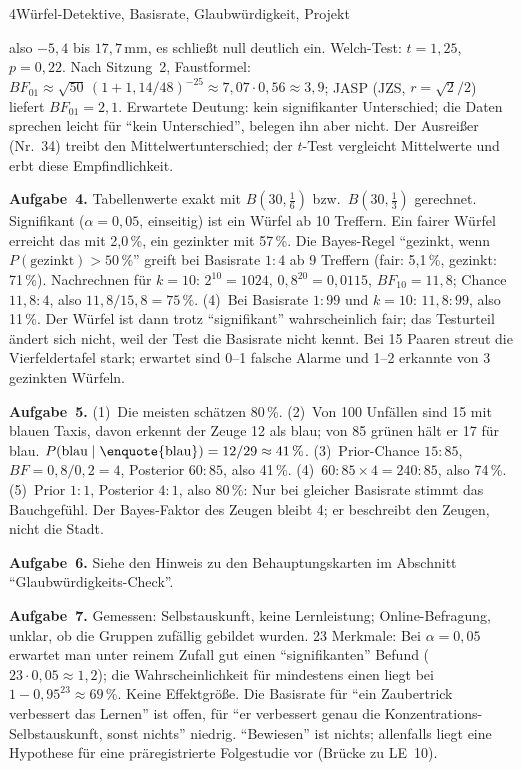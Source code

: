 \begin{uebungsblattb}{4}{Würfel-Detektive, Basisrate, Glaubwürdigkeit, Projekt}
\begin{lehrhinweis}[Erwartungshorizont]
also $-5{,}4$ bis $17{,}7$\,mm, es schließt null deutlich ein. Welch-Test: $t=1{,}25$, $p=0{,}22$. Nach Sitzung~2, Faustformel:
$\mathit{BF}_{01}\approx\sqrt{50}\,(1+1{,}14/48)^{-25}\approx 7{,}07\cdot0{,}56\approx3{,}9$;
JASP (JZS, $r=\sqrt2/2$) liefert $\mathit{BF}_{01}=2{,}1$. Erwartete
Deutung: kein signifikanter Unterschied; die Daten sprechen leicht für
\enquote{kein Unterschied}, belegen ihn aber nicht. Der Ausreißer
(Nr.~34) treibt den Mittelwertunterschied; der $t$-Test vergleicht
Mittelwerte und erbt diese Empfindlichkeit.

\textbf{Aufgabe~4.} Tabellenwerte exakt mit $B(30,\tfrac16)$ bzw.\
$B(30,\tfrac13)$ gerechnet. Signifikant ($\alpha=0{,}05$, einseitig) ist
ein Würfel ab 10 Treffern. Ein fairer Würfel erreicht das mit 2,0\,\%, ein
gezinkter mit 57\,\%. Die Bayes-Regel \enquote{gezinkt, wenn
$P(\text{gezinkt})>50\,\%$} greift bei Basisrate $1:4$ ab 9 Treffern
(fair: 5,1\,\%, gezinkt: 71\,\%). Nachrechnen für $k=10$:
$2^{10}=1024$, $0{,}8^{20}=0{,}0115$, $\mathit{BF}_{10}=11{,}8$; Chance
$11{,}8:4$, also $11{,}8/15{,}8=75\,\%$. (4)~Bei Basisrate $1:99$ und
$k=10$: $11{,}8:99$, also 11\,\%. Der Würfel ist dann trotz
\enquote{signifikant} wahrscheinlich fair; das Testurteil ändert sich
nicht, weil der Test die Basisrate nicht kennt. Bei 15 Paaren streut die
Vierfeldertafel stark; erwartet sind 0--1 falsche Alarme und 1--2 erkannte
von 3 gezinkten Würfeln.

\textbf{Aufgabe~5.} (1)~Die meisten schätzen 80\,\%. (2)~Von 100 Unfällen
sind 15 mit blauen Taxis, davon erkennt der Zeuge 12 als blau; von 85
grünen hält er 17 für blau. $P(\text{blau}\mid\text{\enquote{blau}})=12/29\approx41\,\%$.
(3)~Prior-Chance $15:85$, $\mathit{BF}=0{,}8/0{,}2=4$, Posterior
$60:85$, also 41\,\%. (4)~$60:85\times4=240:85$, also 74\,\%.
(5)~Prior $1:1$, Posterior $4:1$, also 80\,\%: Nur bei gleicher Basisrate
stimmt das Bauchgefühl. Der Bayes-Faktor des Zeugen bleibt 4; er
beschreibt den Zeugen, nicht die Stadt.

\textbf{Aufgabe~6.} Siehe den Hinweis zu den Behauptungskarten im
Abschnitt \enquote{Glaubwürdigkeits-Check}.

\textbf{Aufgabe~7.} Gemessen: Selbstauskunft, keine Lernleistung;
Online-Befragung, unklar, ob die Gruppen zufällig gebildet wurden. 23
Merkmale: Bei $\alpha=0{,}05$ erwartet man unter reinem Zufall gut einen
\enquote{signifikanten} Befund ($23\cdot0{,}05\approx1{,}2$); die
Wahrscheinlichkeit für mindestens einen liegt bei $1-0{,}95^{23}\approx
69\,\%$. Keine Effektgröße. Die Basisrate für \enquote{ein Zaubertrick
verbessert das Lernen} ist offen, für \enquote{er verbessert genau die
Konzentrations-Selbstauskunft, sonst nichts} niedrig. \enquote{Bewiesen}
ist nichts; allenfalls liegt eine Hypothese für eine präregistrierte
Folgestudie vor (Brücke zu LE~10).


\end{lehrhinweis}
\end{uebungsblattb}
